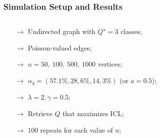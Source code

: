 \documentclass{beamer}
\begin{document}
\begin{frame}
  \frametitle{Simulation Setup and Results}

\begin{columns}
   \begin{column}{0.6\linewidth}
    \begin{itemize}
    \item[\bf{$\rightarrow$}] Undirected graph with $Q^\star=3$ classes;\medskip
    \item[\bf{$\rightarrow$}] Poisson-valued edges;\medskip
    \item[\bf{$\rightarrow$}] $n=50,\ 100,\ 500,\ 1000$ vertices;\medskip
    \item[\bf{$\rightarrow$}] $\alpha_q = (57.1\%,28,6\%,14,3\%)$ (or
    $a=0.5$);\medskip
    \item[\bf{$\rightarrow$}] $\lambda = 2, \gamma = 0.5$; \medskip
    \item[\bf{$\rightarrow$}] Retrieve $Q$ that maximizes ICL;\medskip
    \item[\bf{$\rightarrow$}] $100$ repeats for each value of $n$;
    \end{itemize}
   \end{column}

   \begin{column}{0.4\linewidth}
  \end{column}
\end{columns}

\end{frame}
\end{document}
